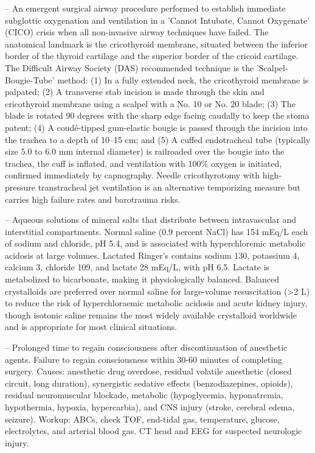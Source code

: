 -- An emergent surgical airway procedure performed to establish immediate subglottic oxygenation and ventilation in a 'Cannot Intubate, Cannot Oxygenate' (CICO) crisis when all non-invasive airway techniques have failed. The anatomical landmark is the cricothyroid membrane, situated between the inferior border of the thyroid cartilage and the superior border of the cricoid cartilage. The Difficult Airway Society (DAS) recommended technique is the 'Scalpel-Bougie-Tube' method: (1) In a fully extended neck, the cricothyroid membrane is palpated; (2) A transverse stab incision is made through the skin and cricothyroid membrane using a scalpel with a No. 10 or No. 20 blade; (3) The blade is rotated 90 degrees with the sharp edge facing caudally to keep the stoma patent; (4) A coudé-tipped gum-elastic bougie is passed through the incision into the trachea to a depth of 10--15 cm; and (5) A cuffed endotracheal tube (typically size 5.0 to 6.0 mm internal diameter) is railroaded over the bougie into the trachea, the cuff is inflated, and ventilation with 100\% oxygen is initiated, confirmed immediately by capnography. Needle cricothyrotomy with high-pressure transtracheal jet ventilation is an alternative temporizing measure but carries high failure rates and barotrauma risks.

-- Aqueous solutions of mineral salts that distribute between intravascular and interstitial compartments. Normal saline (0.9 percent NaCl) has 154 mEq/L each of sodium and chloride, pH 5.4, and is associated with hyperchloremic metabolic acidosis at large volumes. Lactated Ringer's contains sodium 130, potassium 4, calcium 3, chloride 109, and lactate 28 mEq/L, with pH 6.5. Lactate is metabolized to bicarbonate, making it physiologically balanced. Balanced crystalloids are preferred over normal saline for large-volume resuscitation (>2 L) to reduce the risk of hyperchloraemic metabolic acidosis and acute kidney injury, though isotonic saline remains the most widely available crystalloid worldwide and is appropriate for most clinical situations.

-- Prolonged time to regain consciousness after discontinuation of anesthetic agents. Failure to regain consciousness within 30-60 minutes of completing surgery. Causes: anesthetic drug overdose, residual volatile anesthetic (closed circuit, long duration), synergistic sedative effects (benzodiazepines, opioids), residual neuromuscular blockade, metabolic (hypoglycemia, hyponatremia, hypothermia, hypoxia, hypercarbia), and CNS injury (stroke, cerebral edema, seizure). Workup: ABCs, check TOF, end-tidal gas, temperature, glucose, electrolytes, and arterial blood gas. CT head and EEG for suspected neurologic injury.

